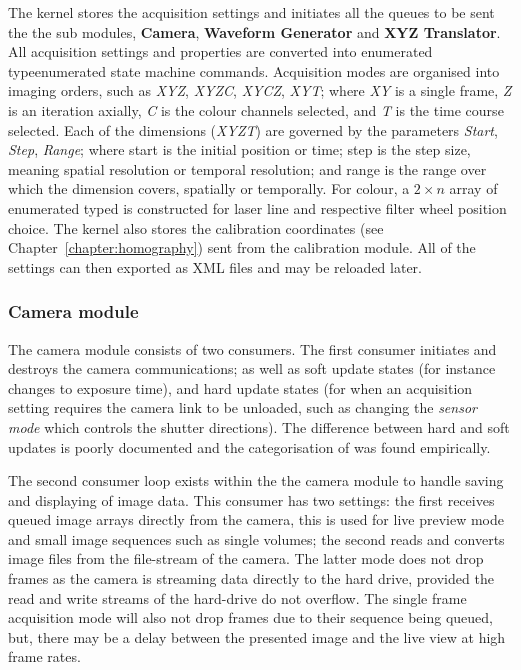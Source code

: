 The kernel stores the acquisition settings and initiates all the queues to be sent the the sub modules, \textbf{Camera}, \textbf{Waveform Generator} and \textbf{XYZ Translator}.
All acquisition settings and properties are converted into \gls{enumerated type}{enumerated} state machine commands.
Acquisition modes are organised into imaging orders, such as \emph{XYZ}, \emph{XYZC}, \emph{XYCZ}, \emph{XYT}; where \emph{XY} is a single frame, \emph{Z} is an iteration axially, \emph{C} is the colour channels selected, and \emph{T} is the time course selected.
Each of the dimensions (\emph{XYZT}) are governed by the parameters \emph{Start}, \emph{Step}, \emph{Range}; where start is the initial position or time; step is the step size, meaning spatial resolution or temporal resolution; and range is the range over which the dimension covers, spatially or temporally.
For colour, a \(2\times n\) array of enumerated typed is constructed for laser line and respective filter wheel position choice.
The kernel also stores the calibration coordinates (see Chapter~\ref{chapter:homography}) sent from the calibration module.
All of the
settings can then exported as XML files and may be reloaded later.


\subsubsection{Camera module}

The camera module consists of two consumers.
The first
consumer initiates and destroys the camera communications; as well as
soft update states (for instance changes to \gls{exposure time}), and hard update states
(for when an acquisition setting requires the camera link to be unloaded, such as changing the \emph{sensor mode} which controls the shutter directions).
The difference between hard and soft updates is poorly documented and the categorisation of was found empirically.

The second consumer loop exists within the the camera module to handle saving and displaying of image data.
This consumer has two settings: the first receives queued image arrays directly from the camera, this is used for live preview mode and small image sequences such as single volumes; the second reads and converts image files from the file-stream of the camera.
The latter mode does not drop frames as the camera is streaming data directly to the hard drive, provided the read and write streams of the hard-drive do not overflow.
The single frame acquisition mode will also not drop frames due to their sequence being queued, but, there may be a delay between the presented image and the live view at high frame rates.

